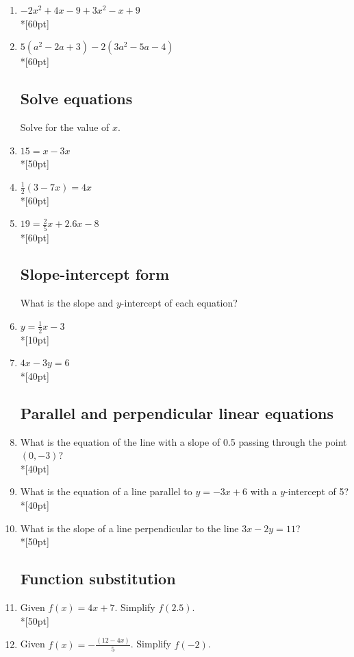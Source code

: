 \documentclass[]{book}
\begin{document}
\begin{enumerate}

\item $-2x^2+4x -9 +3x^2-x+9$\\*[60pt]
\item $5(a^2-2a +3) -2(3a^2-5a-4)$\\*[60pt]

\subsection*{Solve equations}

Solve for the value of $x$.
\item   $15=x-3x$\\*[50pt]
\item   $\frac{1}{2}(3-7x)=4x$\\*[60pt]
\item   $19=\frac{2}{5}x+2.6x-8$\\*[60pt]

\newpage
\subsection*{Slope-intercept form}

What is the slope and $y$-intercept of each equation? 
\item   $y=\frac{1}{2}x-3$\\*[10pt]
\item   $4x-3y=6$\\*[40pt]


\subsection*{Parallel and perpendicular linear equations}

\item What is the equation of the line with a slope of 0.5 passing through the point $(0,-3)$?\\*[40pt]
\item What is the equation of a line parallel to $y=-3x+6$ with a $y$-intercept of 5?\\*[40pt]
\item What is the slope of a line perpendicular to the line $3x-2y=11$?\\*[50pt]

\subsection*{Function substitution}
\item Given $f(x)=4x+7$. Simplify $f(2.5)$.\\*[50pt]
\item Given $\displaystyle f(x)=-\frac{(12-4x)}{5}$. Simplify $f(-2)$.


\end{enumerate}
\end{document}
